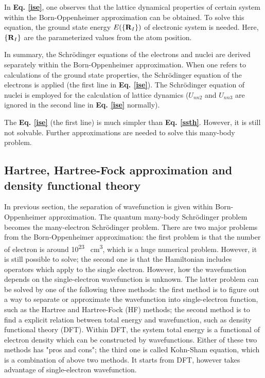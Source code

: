 \documentclass[a4paper, 12pt, titlepage,oneside,drop]{kthesis}
\begin{document}
In \textbf{Eq. \ref{ise}}, one observes that the lattice dynamical properties of certain system within the Born-Oppenheimer approximation can be obtained. To solve this equation,
the ground state energy $E(\{{{\textbf R}_{I}}\})$ of electronic system is needed. Here, $\{{\textbf R}_{I}\}$ are the parameterized values from the atom position.
 
In summary, the Schrödinger equations of the electrons and nuclei are derived separately within the Born-Oppenheimer approximation. When one refers to calculations of the ground state properties,
the Schrödinger equation of the electrons is applied (the first line in \textbf{Eq. \ref{ise}}). The Schrödinger equation of nuclei is employed for the calculation of lattice dynamics 
($U_{nn2}$ and $U_{nn3}$ are ignored in the second line in \textbf{Eq. \ref{ise}} normally).

The \textbf{Eq. \ref{ise}} (the first line) is much simpler than \textbf{Eq. \ref{ssth}}. However, it is still not solvable. Further approximations  are needed
to solve this many-body problem.

\subsection{Hartree, Hartree-Fock approximation and density functional theory}

In previous section, the separation of wavefunction is given within Born-Oppenheimer approximation. The quantum many-body Schrödinger problem becomes the many-electron 
Schrödinger problem. There are two major problems from the Born-Oppenheimer approximation: the first problem is that the number of electron is around 10\textsuperscript{23} \si{\per\cubic\centi\metre}, which is a huge numerical 
problem. However, it is still possible to solve; the second one is that the Hamiltonian includes operators which apply to the single electron. However, how the wavefunction depends on the single-electron wavefunction is unknown.
The latter problem can be solved by one of the following three methods: the first method is to figure out a way to separate or approximate the wavefunction into single-electron function, such as the Hartree and Hartree-Fock (HF)
methods; the second method is to find a explicit relation between total energy and wavefunction, such as density functional theory (DFT). Within DFT, the system total energy is a functional of electron density which can be 
constructed by wavefunctions. Either of these two methods has "pros and cons"; the third one is called Kohn-Sham equation, which is a combination of above two methods. It starts from DFT, however takes advantage of single-electron 
wavefunction. 
\end{document}
